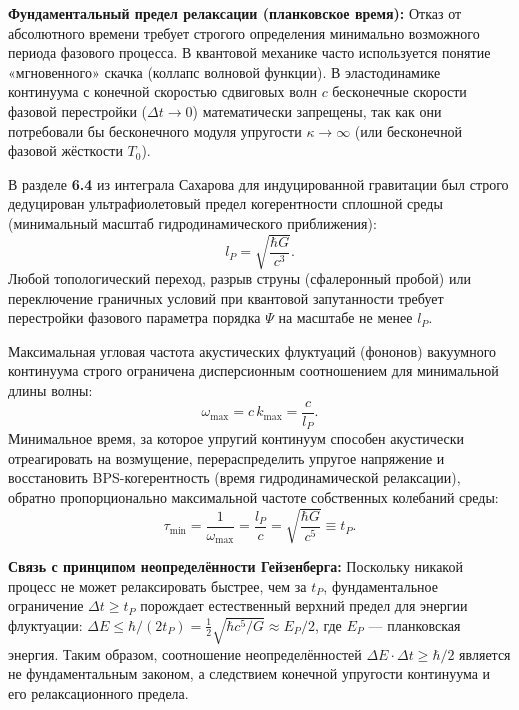 \documentclass[11pt,a4paper]{article}
\begin{document}
	\textbf{Фундаментальный предел релаксации (планковское время):}
	Отказ от абсолютного времени требует строгого определения минимально возможного периода фазового процесса. В квантовой механике часто используется понятие «мгновенного» скачка (коллапс волновой функции). В эластодинамике континуума с конечной скоростью сдвиговых волн $c$ бесконечные скорости фазовой перестройки ($\Delta t \to 0$) математически запрещены, так как они потребовали бы бесконечного модуля упругости $\kappa \to \infty$ (или бесконечной фазовой жёсткости $T_0$).
	
	В разделе \textbf{6.4} из интеграла Сахарова для индуцированной гравитации был строго дедуцирован ультрафиолетовый предел когерентности сплошной среды (минимальный масштаб гидродинамического приближения):
	\begin{equation}
		l_P = \sqrt{\frac{\hbar G}{c^3}}.
	\end{equation}
	Любой топологический переход, разрыв струны (сфалеронный пробой) или переключение граничных условий при квантовой запутанности требует перестройки фазового параметра порядка $\Psi$ на масштабе не менее $l_P$.
	
	Максимальная угловая частота акустических флуктуаций (фононов) вакуумного континуума строго ограничена дисперсионным соотношением для минимальной длины волны:
	\begin{equation}
		\omega_{\text{max}} = c\, k_{\text{max}} = \frac{c}{l_P}.
	\end{equation}
	Минимальное время, за которое упругий континуум способен акустически отреагировать на возмущение, перераспределить упругое напряжение и восстановить BPS-когерентность (время гидродинамической релаксации), обратно пропорционально максимальной частоте собственных колебаний среды:
	\begin{equation}
		\tau_{\text{min}} = \frac{1}{\omega_{\text{max}}} = \frac{l_P}{c} = \sqrt{\frac{\hbar G}{c^5}} \equiv t_P.
	\end{equation}
	
	\textbf{Связь с принципом неопределённости Гейзенберга:}
	Поскольку никакой процесс не может релаксировать быстрее, чем за $t_P$, фундаментальное ограничение $\Delta t \ge t_P$ порождает естественный верхний предел для энергии флуктуации: $\Delta E \le \hbar / (2 t_P) = \frac12 \sqrt{\hbar c^5 / G} \approx E_P/2$, где $E_P$ — планковская энергия. Таким образом, соотношение неопределённостей $\Delta E \cdot \Delta t \ge \hbar/2$ является не фундаментальным законом, а следствием конечной упругости континуума и его релаксационного предела.
	
\end{document}
